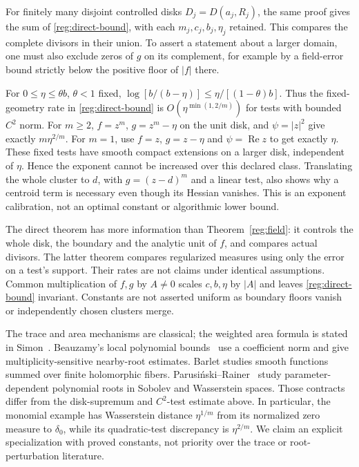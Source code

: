 For finitely many disjoint controlled disks $D_j=D(a_j,R_j)$, the
same proof gives the sum of \eqref{reg:direct-bound}, with each
$m_j,c_j,b_j,\eta_j$ retained. This compares the complete divisors in
their union. To assert a statement about a larger domain, one must also
exclude zeros of $g$ on its complement, for example by a field-error
bound strictly below the positive floor of $|f|$ there.

For $0\le\eta\le\theta b$, $\theta<1$ fixed,
$\log[b/(b-\eta)]\le\eta/[(1-\theta)b]$. Thus the fixed-geometry
rate in \eqref{reg:direct-bound} is
$O(\eta^{\min(1,2/m)})$ for tests with bounded $C^2$ norm.
For $m\ge2$, $f=z^m$, $g=z^m-\eta$ on the unit disk, and
$\psi=|z|^2$ give exactly $m\eta^{2/m}$. For $m=1$, use
$f=z$, $g=z-\eta$ and $\psi=\operatorname{Re}z$ to get exactly
$\eta$. These fixed tests have smooth compact extensions on a larger
disk, independent of $\eta$. Hence the exponent cannot be increased
over this declared class. Translating the whole cluster to $d$, with
$g=(z-d)^m$ and a linear test, also shows why a centroid term is
necessary even though its Hessian vanishes. This is an exponent
calibration, not an optimal constant or algorithmic lower bound.

The direct theorem has more information than Theorem~\ref{reg:field}:
it controls the whole disk, the boundary and the analytic unit of $f$,
and compares actual divisors. The latter theorem compares regularized
measures using only the error on a test's support. Their rates are not
claims under identical assumptions. Common multiplication of $f,g$ by
$A\ne0$ scales $c,b,\eta$ by $|A|$ and leaves
\eqref{reg:direct-bound} invariant. Constants are not asserted uniform
as boundary floors vanish or independently chosen clusters merge.

The trace and area mechanisms are classical; the weighted area formula
is stated in Simon~\cite[Chapter~2, \S3]{Simon}. Beauzamy's local
polynomial bounds~\cite[Theorems~1 and~4]{Beauzamy} use a coefficient
norm and give multiplicity-sensitive nearby-root estimates. Barlet
\cite[pp.~43--44]{Barlet} studies smooth functions summed over finite
holomorphic fibers. Parusi\'nski--Rainer~\cite[Theorem~1.1 and
\S11]{PR} study parameter-dependent polynomial roots in Sobolev and
Wasserstein spaces. Those contracts differ from the disk-supremum and
$C^2$-test estimate above. In particular, the monomial example has
Wasserstein distance $\eta^{1/m}$ from its normalized zero measure to
$\delta_0$, while its quadratic-test discrepancy is $\eta^{2/m}$.
We claim an explicit specialization with proved constants, not priority
over the trace or root-perturbation literature.

